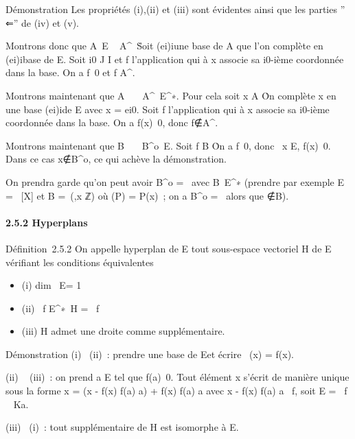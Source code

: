 Démonstration Les propriétés (i),(ii) et (iii) sont évidentes ainsi que
les parties '' ⇐'' de (iv) et (v).

Montrons donc que A\neq~E \rigtharrow~
A^\bot\neq~\0\.
Soit (ei)i\inI une base de A que l'on complète en
(ei)i\inJ base de E. Soit i0 \in J \diagdown I et f
l'application qui à x associe sa i0-ième coordonnée dans la
base. On a f\neq~0 et f \in A^\bot.

Montrons maintenant que
A\neq~\0\ \rigtharrow~
A^\bot\neq~E^∗. Pour cela soit
x \in A \diagdown\0\. On complète x en une base
(ei)i\inI de E avec x = ei0. Soit
f l'application qui à x associe sa i0-ième coordonnée dans la
base. On a f(x)\neq~0, donc
f∉A^\bot.

Montrons maintenant que
B\neq~\0\ \rigtharrow~
B^o\neq~E. Soit f \in B
\diagdown\0\. On a
f\neq~0, donc \exists~x \in E,
f(x)\neq~0. Dans ce cas
x∉B^o, ce qui achève la
démonstration.

On prendra garde qu'on peut avoir B^o =
\0\ avec
B\neq~E^∗ (prendre par exemple E =
~{[}X{]} et B =\
\mathrmVect(\epsilonx,x \in ℤ) où \epsilonx(P)
= P(x)~; on a B^o = \0\
alors que ∉B).

\paragraph{2.5.2 Hyperplans}

Définition~2.5.2 On appelle hyperplan de E tout sous-espace vectoriel H
de E vérifiant les conditions équivalentes

\begin{itemize}
\itemsep1pt\parskip0pt
\item
  (i) dim~ E\diagupH = 1
\item
  (ii) \exists~f \in
  E^∗\diagdown\0\, H
  = \mathrmKer~f
\item
  (iii) H admet une droite comme supplémentaire.
\end{itemize}

Démonstration (i) \rigtharrow~(ii)~: prendre \overlinee une base
de E\diagupH et écrire \pi~(x) = f(x)\overlinee.

(ii) \rigtharrow~ (iii)~: on prend a \in E tel que f(a)\neq~0.
Tout élément x s'écrit de manière unique sous la forme x = (x - f(x)
\over f(a) a) + f(x) \over f(a) a
avec x - f(x) \over f(a) a
\in\mathrmKer~f, soit E
= \mathrmKer~f \oplus~ Ka.

(iii) \rigtharrow~(i)~: tout supplémentaire de H est isomorphe à E\diagupH.

